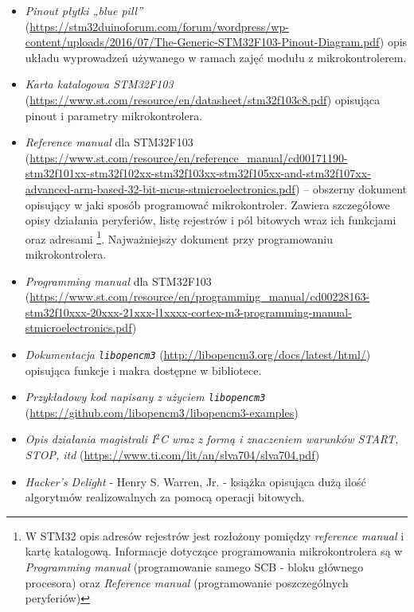 \begin{itemize}
\item \emph{Pinout płytki „blue pill”} (\url{https://stm32duinoforum.com/forum/wordpress/wp-content/uploads/2016/07/The-Generic-STM32F103-Pinout-Diagram.pdf}) opis układu wyprowadzeń używanego w ramach zajęć modułu z mikrokontrolerem.

\item \emph{Karta katalogowa STM32F103} (\url{https://www.st.com/resource/en/datasheet/stm32f103c8.pdf}) opisująca pinout i parametry mikrokontrolera.
\item \emph{Reference manual} dla STM32F103 \label{refman}
	(\url{https://www.st.com/resource/en/reference_manual/cd00171190-stm32f101xx-stm32f102xx-stm32f103xx-stm32f105xx-and-stm32f107xx-advanced-arm-based-32-bit-mcus-stmicroelectronics.pdf})
	– obszerny dokument opisujący w jaki sposób programować  mikrokontroler.
	Zawiera szczegółowe opisy działania peryferiów, listę rejestrów i pól bitowych wraz ich funkcjami oraz  adresami
	\footnote{%
		W STM32 opis adresów rejestrów jest rozłożony pomiędzy \textit{reference manual} i kartę katalogową. Informacje dotyczące
		programowania mikrokontrolera są w \textit{Programming manual} (programowanie samego SCB - bloku głównego procesora) oraz
		\textit{Reference manual} (programowanie poszczególnych peryferiów)
	}.
	Najważniejszy dokument przy programowaniu mikrokontrolera.
\item \emph{Programming manual} dla STM32F103
	(\url{https://www.st.com/resource/en/programming_manual/cd00228163-stm32f10xxx-20xxx-21xxx-l1xxxx-cortex-m3-programming-manual-stmicroelectronics.pdf})

\item \emph{Dokumentacja \Verb$libopencm3$} (\url{http://libopencm3.org/docs/latest/html/}) opisująca funkcje i makra dostępne w bibliotece.
\item \emph{Przykładowy kod napisany z użyciem \Verb$libopencm3$}\\ (\url{https://github.com/libopencm3/libopencm3-examples}) 

\item \emph{Opis działania magistrali I$^2$C wraz z formą i znaczeniem warunków START, STOP, itd} (\url{https://www.ti.com/lit/an/slva704/slva704.pdf})

\item \emph{Hacker's Delight} - Henry S. Warren, Jr. - książka opisująca dużą ilość algorytmów realizowalnych za pomocą operacji bitowych.
\end{itemize}
